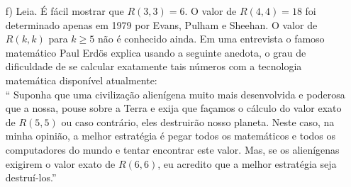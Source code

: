 \begin{enumerate}[leftmargin=*]
\begin{itemize}
		\item[f)] Leia. É fácil mostrar que $R(3,3)=6$. 
		O valor de $R(4,4)=18$ foi determinado apenas em 1979 
		por 	Evans, Pulham e Sheehan. 
		O valor de $R(k,k)$ para $k\geq 5$ não é conhecido ainda.
		Em uma entrevista o famoso matemático Paul Erdös 
		explica usando a seguinte anedota,
		o grau de dificuldade de se calcular exatamente
		tais números com a tecnologia matemática disponível atualmente: \\
		`` Suponha que uma civilização alienígena muito 
		mais desenvolvida e poderosa que a nossa, 
		pouse sobre a Terra e exija que façamos o cálculo do valor
		exato de $R(5,5)$ ou caso contrário, eles destruirão nosso planeta. 
		Neste caso, 
		na minha opinião, a melhor estratégia é pegar todos os matemáticos e todos
		os computadores do mundo e tentar encontrar este valor.
		Mas, se os alienígenas exigirem o valor exato de $R(6,6)$,
		eu acredito que 	a melhor estratégia seja destruí-los.''
		 
	\end{itemize}























\end{enumerate}